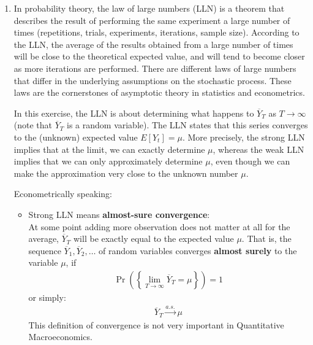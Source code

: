 \begin{enumerate}
\item In probability theory, the law of large numbers (LLN) is a theorem
  that describes the result of performing the same experiment a large number of times
  (repetitions, trials, experiments, iterations, sample size).
According to the LLN, the average of the results obtained from a large number of times
  will be close to the theoretical expected value,
  and will tend to become closer as more iterations are performed.
There are different laws of large numbers that differ in the underlying assumptions on the stochastic process.
These laws are the cornerstones of asymptotic theory in statistics and econometrics.

In this exercise, the LLN is about determining what happens to \(\overline{Y}_T\) as \(T\rightarrow\infty\)
  (note that \(\overline{Y}_T\) is a random variable).
The LLN states that this series converges to the (unknown) expected value \(E[Y_t] = \mu \).
More precisely, the strong LLN implies that at the limit, we can exactly determine \( \mu \),
  whereas the weak LLN implies that we can only approximately determine \( \mu \),
  even though we can make the approximation very close to the unknown number \( \mu \).

Econometrically speaking:
\begin{itemize}
    \item Strong LLN means \textbf{almost-sure convergence}:\\
    At some point adding more observation does not matter at all for the average,
      \(\overline{Y}_T\) will be exactly equal to the expected value \(\mu \).
    That is, the sequence \(\overline{Y}_{1},\overline{Y}_{2},\ldots \) of random variables
      converges \textbf{almost surely} to the variable \(\mu \), if
    \begin{align*}
    \Pr\left( \left \{ \lim_{T\rightarrow \infty }\overline{Y}_{T}=\mu\right \} \right) =1
    \end{align*}
      or simply:
    \begin{align*}
    \overline{Y}_{T}\overset{a.s.}{\rightarrow }\mu
    \end{align*}
    This definition of convergence is not very important in Quantitative Macroeconomics.
				

\end{itemize}
\end{enumerate}
